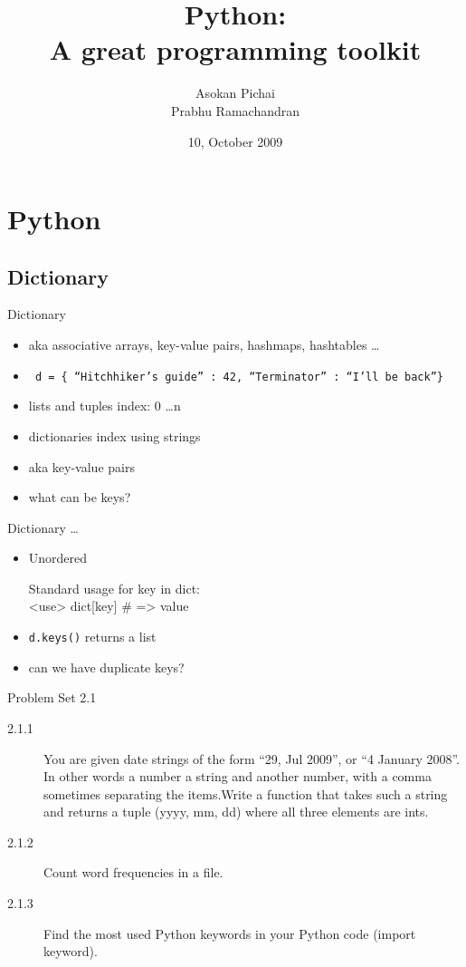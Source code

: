 \documentclass[14pt,compress]{beamer}
\title[Basic Python]{Python:\\A great programming toolkit}
\author[Asokan \& Prabhu] {Asokan Pichai\\Prabhu Ramachandran}
\institute[IIT Bombay] {Department of Aerospace Engineering\\IIT Bombay}
\date[] {10, October 2009}
\newcounter{time}
\newcommand{\inctime}[1]{\addtocounter{time}{#1}{\tiny \thetime\ m}}
\newcommand{\typ}[1]{\texttt{#1}}
\begin{document}
\begin{frame}
  \titlepage
\end{frame}

\section{Python}

\subsection{Dictionary}
\begin{frame}{Dictionary}
  \begin{itemize}
    \item aka associative arrays, key-value pairs, hashmaps, hashtables \ldots    
    \item \typ{ d = \{ ``Hitchhiker's guide'' : 42, ``Terminator'' : ``I'll be back''\}}
    \item lists and tuples index: 0 \ldots n
    \item dictionaries index using strings
    \item aka key-value pairs
    \item what can be keys?
  \end{itemize}
\end{frame}

\begin{frame}{Dictionary \ldots }
  \begin{itemize}
    \item \alert{Unordered}
      \begin{block}{Standard usage}
        for key in dict:\\
            <use> dict[key] \# => value
      \end{block}
    \item \typ{d.keys()} returns a list
    \item can we have duplicate keys?
  \end{itemize}
  \inctime{5}
\end{frame}

\begin{frame} {Problem Set 2.1}
  \begin{description}
\item[2.1.1] You are given date strings of the form ``29, Jul 2009'', or ``4 January 2008''. In other words a number a string and another number, with a comma sometimes separating the items.Write a function that takes such a string and returns a tuple (yyyy, mm, dd) where all three elements are ints.
    \item[2.1.2] Count word frequencies in a file.
    \item[2.1.3] Find the most used Python keywords in your Python code (import keyword).
\end{description}

\inctime{10}
\end{frame}
\end{document}
